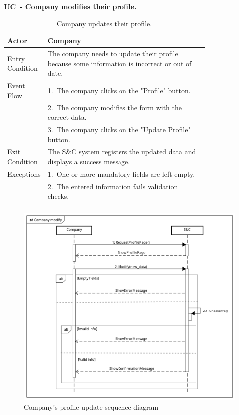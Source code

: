 \textbf{UC\cuc\  - Company modifies their profile.}

\begin{center}
    \renewcommand{\arraystretch}{1.2}
    \begin{longtable}{ l p{0.8\linewidth} } 
        \hline
        Actor & Company \\ \hline
        Entry Condition & The company needs to update their profile because some information is incorrect or out of date. \\ \hline
        Event Flow & 1.\ The company clicks on the "Profile" button. \\
        & 2.\ The company modifies the form with the correct data. \\
        & 3.\ The company clicks on the "Update Profile" button. \\ \hline
        Exit Condition & The S\&C system registers the updated data and displays a success message. \\ \hline
        Exceptions & 1.\ One or more mandatory fields are left empty. \\
        & 2.\ The entered information fails validation checks. \\ \hline
        \caption{Company updates their profile.}
        \label{tab:company_profile_update_uc}%
    \end{longtable}
\end{center}

\begin{figure}[H]
    \centering
    \includegraphics[width=1\linewidth]{Images/Sequence diagrams/Company modify.png}
    \caption{Company's profile update sequence diagram}
    \label{fig:enter-label}
\end{figure}

